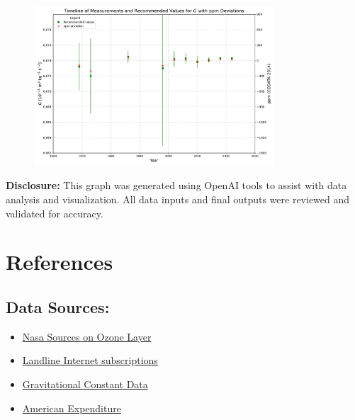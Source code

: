 \documentclass[a4paper,landscape]{article}
\begin{document}
\begin{figure}[H]
    \centering
    \includegraphics[width=0.8\textwidth]{gravitational_constant.pdf} %
    \caption{}
    \label{fig:G}
\end{figure}


\textbf{Disclosure:} This graph was generated using OpenAI tools to assist with data analysis and visualization. All data inputs and final outputs were reviewed and validated for accuracy.

\section{References}
\subsection{Data Sources:}
\begin{itemize}
    \item \href{https://ourworldindata.org/ozone-layer?insight=emissions-of-substances-that-deplete-the-ozone-layer-have-fallen-by-more-than-99#key-insights}{Nasa Sources on Ozone Layer}
    \item \href{https://ourworldindata.org/internet}{Landline Internet subscriptions}
    \item \href{https://en.wikipedia.org/wiki/Gravitational_constant}{Gravitational Constant Data}
    \item \href{https://www.bls.gov/news.release/cesan.nr0.htm}{American Expenditure}
\end{itemize}
\end{document}
